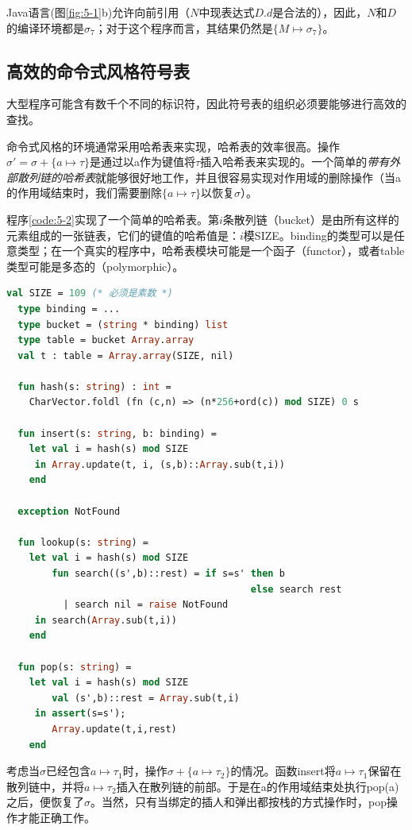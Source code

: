\documentclass[cn,11pt,chinese]{elegantbook}
\begin{document}
Java语言(图\ref{fig:5-1}b)允许向前引用（$N$中现表达式$D.d$是合法的），因此，$N$和$D$的编译环境都是$\sigma_7$；对于这个程序而言，其结果仍然是$\{M\mapsto\sigma_7\}$。

\subsection{高效的命令式风格符号表}

大型程序可能含有数千个不同的标识符，因此符号表的组织必须要能够进行高效的查找。

命令式风格的环境通常采用哈希表来实现，哈希表的效率很高。操作$\sigma' = \sigma + \{a\mapsto \tau\}$是通过以a作为键值将$\tau$插入哈希表来实现的。一个简单的\textit{带有外部散列链的哈希表}就能够很好地工作，并且很容易实现对作用域的删除操作（当a的作用域结束时，我们需要删除$\{a\mapsto\tau\}$以恢复$\sigma$）。

程序\ref{code:5-2}实现了一个简单的哈希表。第$i$条散列链（bucket）是由所有这样的元素组成的一张链表，它们的键值的哈希值是：$i$模SIZE。binding的类型可以是任意类型；在一个真实的程序中，哈希表模块可能是一个函子（functor），或者table类型可能是多态的（polymorphic）。

\begin{lstlisting}[language=ml,caption={带有外部散列链的哈希表},label={code:5-2}]
  val SIZE = 109 (* 必须是素数 *)
  type binding = ...
  type bucket = (string * binding) list
  type table = bucket Array.array
  val t : table = Array.array(SIZE, nil)

  fun hash(s: string) : int =
    CharVector.foldl (fn (c,n) => (n*256+ord(c)) mod SIZE) 0 s

  fun insert(s: string, b: binding) =
    let val i = hash(s) mod SIZE
     in Array.update(t, i, (s,b)::Array.sub(t,i))
    end

  exception NotFound

  fun lookup(s: string) =
    let val i = hash(s) mod SIZE
        fun search((s',b)::rest) = if s=s' then b
                                           else search rest
          | search nil = raise NotFound
     in search(Array.sub(t,i))
    end

  fun pop(s: string) =
    let val i = hash(s) mod SIZE
        val (s',b)::rest = Array.sub(t,i)
     in assert(s=s');
        Array.update(t,i,rest)
    end
\end{lstlisting}

考虑当$\sigma$已经包含$a\mapsto\tau_1$时，操作$\sigma+\{a\mapsto\tau_2\}$的情况。函数insert将$a\mapsto\tau_1$保留在散列链中，并将$a\mapsto\tau_2$插入在散列链的前部。于是在a的作用域结束处执行pop(a)之后，便恢复了$\sigma$。当然，只有当绑定的插人和弹出都按栈的方式操作时，pop操作才能正确工作。
\end{document}
